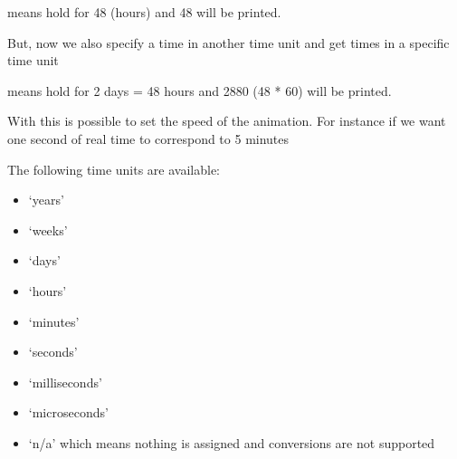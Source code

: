 \documentclass[letterpaper,10pt,english]{sphinxmanual}
\begin{document}
means hold for 48 (hours) and 48 will be printed.

But, now we also specify a time in another time unit and get times in a specific time unit

\begin{sphinxVerbatim}[commandchars=\\\{\}]
 
  
\end{sphinxVerbatim}

means hold for 2 days = 48 hours and 2880 (48 * 60) will be printed.

With this is possible to set the speed of the animation. For instance if we want one second of real time to
correspond to 5 minutes

\begin{sphinxVerbatim}[commandchars=\\\{\}]
\end{sphinxVerbatim}

The following time units are available:
\begin{itemize}
\item {} 
‘years’

\item {} 
‘weeks’

\item {} 
‘days’

\item {} 
‘hours’

\item {} 
‘minutes’

\item {} 
‘seconds’

\item {} 
‘milliseconds’

\item {} 
‘microseconds’

\item {} 
‘n/a’ which means nothing is assigned and conversions are not supported

\end{itemize}
\end{document}
